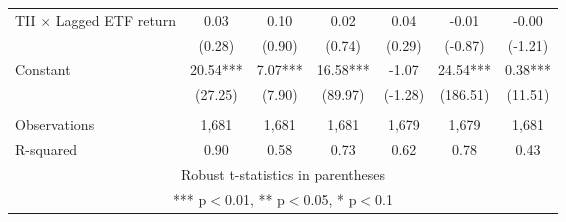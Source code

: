 \documentclass[]{article}
\begin{document}
\begin{tabular}{lcccccc}
TII $\times$ Lagged ETF return & 0.03 & 0.10 & 0.02 & 0.04 & -0.01 & -0.00 \\
 & (0.28) & (0.90) & (0.74) & (0.29) & (-0.87) & (-1.21) \\
Constant & 20.54*** & 7.07*** & 16.58*** & -1.07 & 24.54*** & 0.38*** \\
 & (27.25) & (7.90) & (89.97) & (-1.28) & (186.51) & (11.51) \\
 &  &  &  &  &  &  \\
Observations & 1,681 & 1,681 & 1,681 & 1,679 & 1,679 & 1,681 \\
 R-squared & 0.90 & 0.58 & 0.73 & 0.62 & 0.78 & 0.43 \\ \hline
\multicolumn{7}{c}{ Robust t-statistics in parentheses} \\
\multicolumn{7}{c}{ *** p$<$0.01, ** p$<$0.05, * p$<$0.1} \\
\end{tabular}
\end{document}
